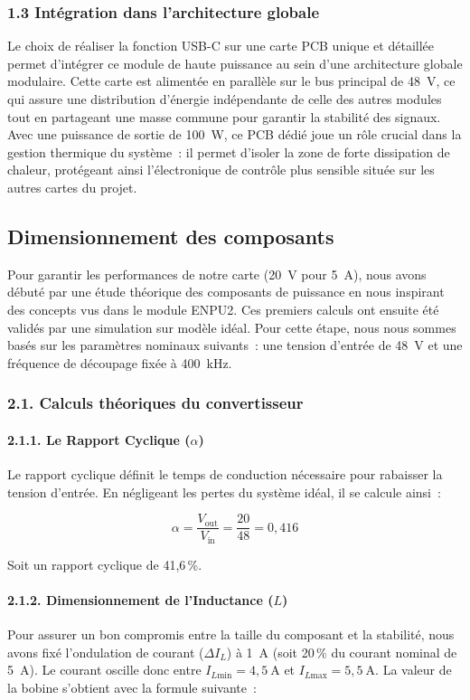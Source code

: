 \subsubsection*{1.3 Intégration dans l'architecture globale}
Le choix de réaliser la fonction USB-C sur une carte PCB unique et détaillée permet d'intégrer ce module de haute puissance au sein d'une architecture globale modulaire. Cette carte est alimentée en parallèle sur le bus principal de 48~V, ce qui assure une distribution d'énergie indépendante de celle des autres modules tout en partageant une masse commune pour garantir la stabilité des signaux. Avec une puissance de sortie de 100~W, ce PCB dédié joue un rôle crucial dans la gestion thermique du système~: il permet d'isoler la zone de forte dissipation de chaleur, protégeant ainsi l'électronique de contrôle plus sensible située sur les autres cartes du projet.

        \subsection{Dimensionnement des composants}

Pour garantir les performances de notre carte (20~V pour 5~A), nous avons débuté par une étude théorique des composants de puissance en nous inspirant des concepts vus dans le module ENPU2. Ces premiers calculs ont ensuite été validés par une simulation sur modèle idéal. Pour cette étape, nous nous sommes basés sur les paramètres nominaux suivants~: une tension d'entrée de 48~V et une fréquence de découpage fixée à 400~kHz.

\subsubsection*{2.1. Calculs théoriques du convertisseur}

\paragraph{2.1.1. Le Rapport Cyclique ($\alpha$)}
Le rapport cyclique définit le temps de conduction nécessaire pour rabaisser la tension d'entrée. En négligeant les pertes du système idéal, il se calcule ainsi~:

$$ \alpha = \frac{V_{\text{out}}}{V_{\text{in}}} = \frac{20}{48} = 0,416 $$

Soit un rapport cyclique de 41,6\,\%.

\paragraph{2.1.2. Dimensionnement de l'Inductance ($L$)}
Pour assurer un bon compromis entre la taille du composant et la stabilité, nous avons fixé l'ondulation de courant ($\Delta I_L$) à 1~A (soit 20\,\% du courant nominal de 5~A). Le courant oscille donc entre $I_{L\text{min}} = 4,5~\text{A}$ et $I_{L\text{max}} = 5,5~\text{A}$. La valeur de la bobine s'obtient avec la formule suivante~:

